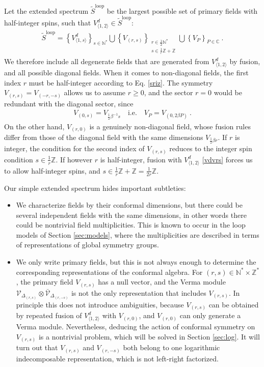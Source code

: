 \documentclass[12pt, a4paper]{article}
\theoremstyle{break}
\begin{document}
Let the extended spectrum $\widetilde{S}^\text{loop}$ be the largest possible set of primary fields with half-integer spins, such that $V^d_{\langle 1,2\rangle}\in \widetilde{S}^\text{loop}$:
\begin{align}
 \boxed{\widetilde{S}^\text{loop} = \left\{V^d_{\langle 1,s\rangle}\right\}_{s\in\mathbb{N}^*}  \bigcup \left\{V_{(r,s)}\right\}_{\substack{r\in \frac12\mathbb{N}^*\\ s\in\frac{1}{r}\mathbb{Z}+\mathbb{Z}}}\bigcup \left\{ V_P\right\}_{P\in\mathbb{C}} } \ .
\end{align}
We therefore include all degenerate fields that are generated from $V^d_{\langle 1,2\rangle}$ by fusion, and all possible diagonal fields. When it comes to non-diagonal fields, the first index $r$ must be half-integer according to Eq. \eqref{sriz}. The symmetry $V_{(r,s)}=V_{(-r,-s)}$ allows us to assume $r\geq 0$, and the sector $r=0$ would be redundant with the diagonal sector, since 
\begin{align}
 V_{(0,s)} = V_{\frac12\beta^{-1}s}  \quad \text{i.e.} \quad V_P = V_{(0,2\beta P)} \ .
 \label{sP}
\end{align}
On the other hand, $V_{(r,0)}$ is a genuinely non-diagonal field, whose fusion rules differ from those of the diagonal field with the same dimensions $V_{\frac12\beta r}$. 
If $r$ is integer, the condition for the second index of $V_{(r,s)}$ reduces to the integer spin condition $s\in\frac{1}{r}\mathbb{Z}$. If however $r$ is half-integer, fusion with $V^d_{\langle 1,2\rangle}$ \eqref{vdvrs} forces us to allow half-integer spins, and $s\in \frac{1}{r}\mathbb{Z} + \mathbb{Z} = \frac{1}{2r}\mathbb{Z}$. 

Our simple extended spectrum hides important subtleties: 
\begin{itemize}
 \item We characterize fields by their conformal dimensions, but there could be several independent fields with the same dimensions, in other words there could be nontrivial field multiplicities. This is known to occur in the loop models of Section \ref{sec:models}, where the multiplicities are described in terms of representations of global symmetry groups.  
 \item We only write primary fields, but this is not always enough to determine the corresponding representations of the conformal algebra. For $(r,s)\in \mathbb{N}^*\times \mathbb{Z}^*$, the primary field $V_{(r,s)}$ has a null vector, and the Verma module $\mathcal{V}_{\Delta_{(r,s)}}\otimes\bar{\mathcal{V}}_{\Delta_{(r,-s)}}$ is not the only representation that includes $V_{(r,s)}$. In principle this does not introduce ambiguities, because $V_{(r,s)}$ can be obtained by repeated fusion of $V^d_{\langle 1,2\rangle}$ with $V_{(r,0)}$, and $V_{(r,0)}$ can only generate a Verma module. Nevertheless, deducing the action of conformal symmetry on $V_{(r,s)}$ is a nontrivial problem, which will be solved in Section \ref{sec:log}. It will turn out that $V_{(r,s)}$ and $V_{(r,-s)}$ both belong to one logarithmic indecomposable representation, which is not left-right factorized. 
\end{itemize}
\end{document}
